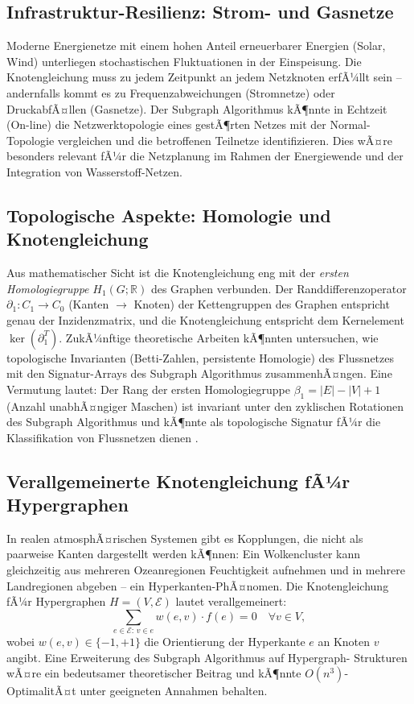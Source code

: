 ﻿\documentclass[a4paper,12pt]{article}
\theoremstyle{definition}
\begin{document}
\subsection{Infrastruktur-Resilienz: Strom- und Gasnetze}

Moderne Energienetze mit einem hohen Anteil erneuerbarer Energien
(Solar, Wind) unterliegen stochastischen Fluktuationen in der Einspeisung.
Die Knotengleichung muss zu jedem Zeitpunkt an jedem Netzknoten erfÃ¼llt
sein -- andernfalls kommt es zu Frequenzabweichungen (Stromnetze) oder
DruckabfÃ¤llen (Gasnetze). Der Subgraph Algorithmus kÃ¶nnte in Echtzeit
(On-line) die Netzwerktopologie eines gestÃ¶rten Netzes mit der
Normal-Topologie vergleichen und die betroffenen Teilnetze identifizieren.
Dies wÃ¤re besonders relevant fÃ¼r die Netzplanung im Rahmen der
Energiewende und der Integration von Wasserstoff-Netzen.

\subsection{Topologische Aspekte: Homologie und Knotengleichung}

Aus mathematischer Sicht ist die Knotengleichung eng mit der
\emph{ersten Homologiegruppe} $H_1(G; \mathbb{R})$ des Graphen verbunden.
Der Randdifferenzoperator $\partial_1: C_1 \to C_0$ (Kanten $\to$ Knoten)
der Kettengruppen des Graphen entspricht genau der Inzidenzmatrix, und
die Knotengleichung entspricht dem Kernelement $\ker(\partial_1^T)$.
ZukÃ¼nftige theoretische Arbeiten kÃ¶nnten untersuchen, wie topologische
Invarianten (Betti-Zahlen, persistente Homologie) des Flussnetzes mit
den Signatur-Arrays des Subgraph Algorithmus zusammenhÃ¤ngen. Eine
Vermutung lautet: Der Rang der ersten Homologiegruppe $\beta_1 = |E| - |V| + 1$
(Anzahl unabhÃ¤ngiger Maschen) ist invariant unter den zyklischen
Rotationen des Subgraph Algorithmus und kÃ¶nnte als topologische
Signatur fÃ¼r die Klassifikation von Flussnetzen dienen \cite{edelsbrunner2010}.

\subsection{Verallgemeinerte Knotengleichung fÃ¼r Hypergraphen}

In realen atmosphÃ¤rischen Systemen gibt es Kopplungen, die nicht als
paarweise Kanten dargestellt werden kÃ¶nnen: Ein Wolkencluster kann
gleichzeitig aus mehreren Ozeanregionen Feuchtigkeit aufnehmen
und in mehrere Landregionen abgeben -- ein Hyperkanten-PhÃ¤nomen.
Die Knotengleichung fÃ¼r Hypergraphen $H = (V, \mathcal{E})$ lautet
verallgemeinert:
\[
  \sum_{e \in \mathcal{E}:\, v \in e} w(e,v) \cdot f(e) = 0 \quad \forall v \in V,
\]
wobei $w(e,v) \in \{-1, +1\}$ die Orientierung der Hyperkante $e$ an
Knoten $v$ angibt. Eine Erweiterung des Subgraph Algorithmus auf Hypergraph-
Strukturen wÃ¤re ein bedeutsamer theoretischer Beitrag und kÃ¶nnte
$O(n^3)$-OptimalitÃ¤t unter geeigneten Annahmen behalten.
\end{document}
